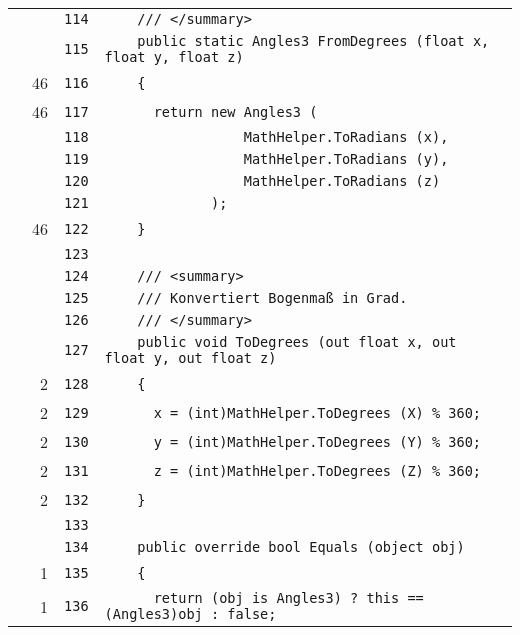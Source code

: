 \documentclass[a4paper,10pt]{article}
\begin{document}
\begin{longtable}[l]{lrrl}
\cellcolor{gray} &  & \verb~114~ & \verb~    /// </summary>~\\
\cellcolor{gray} &  & \verb~115~ & \verb~    public static Angles3 FromDegrees (float x, float y, float z)~\\
\cellcolor{green} & 46 & \verb~116~ & \verb~    {~\\
\cellcolor{green} & 46 & \verb~117~ & \verb~      return new Angles3 (~\\
\cellcolor{gray} &  & \verb~118~ & \verb~                 MathHelper.ToRadians (x),~\\
\cellcolor{gray} &  & \verb~119~ & \verb~                 MathHelper.ToRadians (y),~\\
\cellcolor{gray} &  & \verb~120~ & \verb~                 MathHelper.ToRadians (z)~\\
\cellcolor{gray} &  & \verb~121~ & \verb~             );~\\
\cellcolor{green} & 46 & \verb~122~ & \verb~    }~\\
\cellcolor{gray} &  & \verb~123~ & \verb~~\\
\cellcolor{gray} &  & \verb~124~ & \verb~    /// <summary>~\\
\cellcolor{gray} &  & \verb~125~ & \verb~    /// Konvertiert Bogenmaß in Grad.~\\
\cellcolor{gray} &  & \verb~126~ & \verb~    /// </summary>~\\
\cellcolor{gray} &  & \verb~127~ & \verb~    public void ToDegrees (out float x, out float y, out float z)~\\
\cellcolor{green} & 2 & \verb~128~ & \verb~    {~\\
\cellcolor{green} & 2 & \verb~129~ & \verb~      x = (int)MathHelper.ToDegrees (X) % 360;~\\
\cellcolor{green} & 2 & \verb~130~ & \verb~      y = (int)MathHelper.ToDegrees (Y) % 360;~\\
\cellcolor{green} & 2 & \verb~131~ & \verb~      z = (int)MathHelper.ToDegrees (Z) % 360;~\\
\cellcolor{green} & 2 & \verb~132~ & \verb~    }~\\
\cellcolor{gray} &  & \verb~133~ & \verb~~\\
\cellcolor{gray} &  & \verb~134~ & \verb~    public override bool Equals (object obj)~\\
\cellcolor{green} & 1 & \verb~135~ & \verb~    {~\\
\cellcolor{green} & 1 & \verb~136~ & \verb~      return (obj is Angles3) ? this == (Angles3)obj : false;~\\

\end{longtable}
\end{document}
